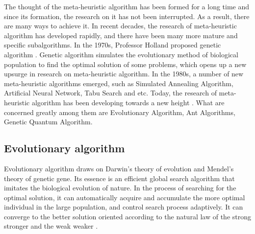 The thought of the meta-heuristic algorithm has been formed for a long time 
and since its formation, the research on it has not been interrupted. As a 
result, there are many ways to achieve it. In recent decades, the research of 
meta-heuristic algorithm has developed rapidly, and there have been many more 
mature and specific subalgorithms. In the 1970s, Professor Holland proposed 
genetic algorithm \cite{holland}. Genetic algorithm simulates the 
evolutionary method of biological population to find the optimal solution of 
some problems, which opens up a new upsurge in research on meta-heuristic 
algorithm. In the 1980s, a number of new meta-heuristic algorithms emerged, 
such as Simulated Annealing Algorithm, Artificial Neural Network, Tabu Search 
and etc. Today, the research of meta-heuristic algorithm has been developing 
towards a new height \cite{harman}. What are concerned greatly among them are 
Evolutionary Algorithm, Ant Algorithms, Genetic Quantum Algorithm.




\subsection{Evolutionary algorithm}

Evolutionary algorithm draws on Darwin's theory of evolution and Mendel's 
theory of genetic gene. Its essence is an efficient global search algorithm 
that imitates the biological evolution of nature. In the process of searching 
for the optimal solution, it can automatically acquire and accumulate the 
more optimal individual in the large population, and control search process 
adaptively. It can converge to the better solution oriented according to the 
natural law of the strong stronger and the weak weaker \cite{deb}.


